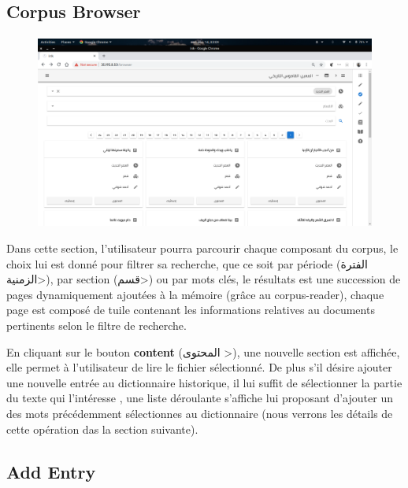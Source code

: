 \documentclass[]{report}
\begin{document}
		\subsection{Corpus Browser}
			\paragraph{}
			\begin{figure}[H]
				\centering
				\includegraphics[width=0.8\linewidth]{images/app/corpusbrowser.png}
			\end{figure}
			Dans cette section, l'utilisateur pourra parcourir chaque composant du corpus, le choix lui est donné pour filtrer 
			sa recherche, que ce soit par période (\<الفترة الزمنية>), par section (\<قسم>) ou par mots clés, le résultats est une succession de pages dynamiquement ajoutées à la mémoire (grâce au corpus-reader), chaque page est composé de tuile contenant les informations relatives au documents pertinents selon le filtre de recherche.
			\par
			En cliquant sur le bouton \textbf{content} (\<المحتوى >), une nouvelle section est affichée, elle permet à l'utilisateur 
			de lire le fichier sélectionné. De plus s'il désire ajouter une nouvelle entrée au dictionnaire historique, il lui suffit de sélectionner la partie du texte qui l'intéresse , une liste déroulante s'affiche lui proposant d'ajouter un des mots précédemment sélectionnes au dictionnaire (nous verrons les détails de cette opération das la section suivante).
			
		\subsection{Add Entry}
\end{document}
